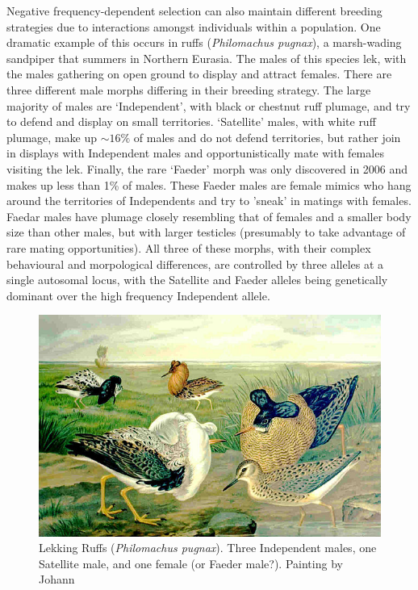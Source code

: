 {Negative frequency-dependent selection can also maintain different 
breeding strategies due to interactions amongst individuals within a population. One
dramatic example of this occurs in ruffs ({\it Philomachus pugnax}), a
marsh-wading sandpiper that summers in Northern Eurasia. The males of this species
lek, with the males gathering on open ground to display and attract females. There are three different male morphs differing in their breeding
strategy. The large majority of males are `Independent', with black or
chestnut ruff plumage, and try to defend and display on small territories. `Satellite' males, with white ruff plumage, make
up $\sim 16\%$ of males and do not defend territories, but rather join
in displays with Independent males and opportunistically mate with
females visiting the lek. Finally, the rare `Faeder' morph was only discovered
in 2006 \citep{jukema2006permanent} and makes up less than 1\% of males. These Faeder males are female mimics who hang
around the territories of Independents and try to 'sneak' in matings with females. Faedar males have plumage closely resembling
that of females and a smaller body size than other males, but with larger testicles (presumably to
take advantage of rare mating opportunities). All three of these
morphs, with their complex behavioural and morpological differences,
are controlled by three alleles at a single autosomal locus, with the
Satellite and Faeder alleles being genetically dominant over the high frequency
Independent allele.
\begin{figure}
\begin{center}
  \includegraphics[width = 0.8 \textwidth]{illustration_images/single_locus_selection/Ruffs/Philomachus_pugnax_naumann.jpg}
\end{center}
\caption{Lekking Ruffs ({\it Philomachus pugnax}). Three Independent males, one Satellite male, and one female
(or Faeder male?). {\newline \noindent  \tiny{ Painting by Johann
}}}
\end{figure}}
